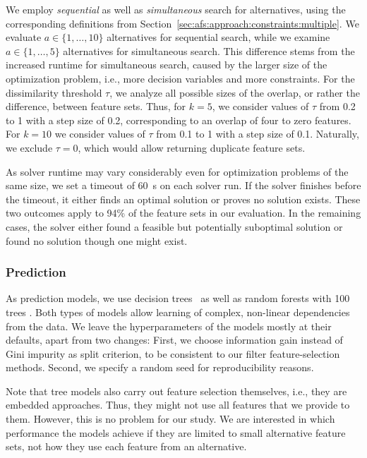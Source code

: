 \documentclass{article}
\theoremstyle{definition}
\begin{document}
We employ \emph{sequential} as well as \emph{simultaneous} search for alternatives, using the corresponding definitions from Section~\ref{sec:afs:approach:constraints:multiple}.
We evaluate $a \in \{1, \dots, 10\}$ alternatives for sequential search, while we examine $a \in \{1, \dots, 5\}$ alternatives for simultaneous search.
This difference stems from the increased runtime for simultaneous search, caused by the larger size of the optimization problem, i.e., more decision variables and more constraints.
For the dissimilarity threshold $\tau$, we analyze all possible sizes of the overlap, or rather the difference, between feature sets.
Thus, for $k=5$, we consider values of $\tau$ from 0.2 to 1 with a step size of 0.2, corresponding to an overlap of four to zero features.
For $k=10$ we consider values of $\tau$ from 0.1 to 1 with a step size of 0.1.
Naturally, we exclude $\tau = 0$, which would allow returning duplicate feature sets.

As solver runtime may vary considerably even for optimization problems of the same size, we set a timeout of 60~s on each solver run.
If the solver finishes before the timeout, it either finds an optimal solution or proves no solution exists.
These two outcomes apply to 94\% of the feature sets in our evaluation.
In the remaining cases, the solver either found a feasible but potentially suboptimal solution or found no solution though one might exist.

\subsubsection{Prediction}
\label{sec:afs:experimental-design:approaches:prediction}

As prediction models, we use decision trees~\cite{breiman1984classification} as well as random forests with 100 trees \cite{breiman2001random}.
Both types of models allow learning of complex, non-linear dependencies from the data.
We leave the hyperparameters of the models mostly at their defaults, apart from two changes:
First, we choose information gain instead of Gini impurity as split criterion, to be consistent to our filter feature-selection methods.
Second, we specify a random seed for reproducibility reasons.

Note that tree models also carry out feature selection themselves, i.e., they are embedded approaches.
Thus, they might not use all features that we provide to them.
However, this is no problem for our study.
We are interested in which performance the models achieve if they are limited to small alternative feature sets, not how they use each feature from an alternative.
\end{document}
